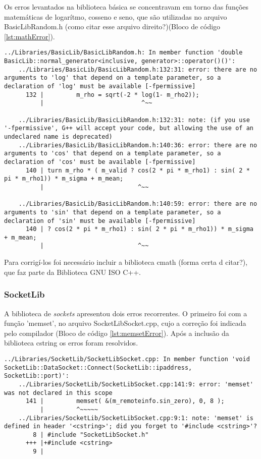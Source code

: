 Os erros levantados na biblioteca básica se concentravam em torno das funções matemáticas 
de logarítmo, cosseno e seno, que são utilizadas no arquivo BasicLibRandom.h 
(como citar esse arquivo direito?)(Bloco de código \ref{lst:mathError}).
    
\begin{lstlisting}[breaklines, label={lst:mathError}, caption={Exemplo de erros da biblioteca básica}]
    ../Libraries/BasicLib/BasicLibRandom.h: In member function 'double BasicLib::normal_generator<inclusive, generator>::operator()()':
    ../Libraries/BasicLib/BasicLibRandom.h:132:31: error: there are no arguments to 'log' that depend on a template parameter, so a declaration of 'log' must be available [-fpermissive]
      132 |         m_rho = sqrt(-2 * log(1- m_rho2));
          |                           ^~~

    ../Libraries/BasicLib/BasicLibRandom.h:132:31: note: (if you use '-fpermissive', G++ will accept your code, but allowing the use of an undeclared name is deprecated)
    ../Libraries/BasicLib/BasicLibRandom.h:140:36: error: there are no arguments to 'cos' that depend on a template parameter, so a declaration of 'cos' must be available [-fpermissive]
      140 | turn m_rho * ( m_valid ? cos(2 * pi * m_rho1) : sin( 2 * pi * m_rho1)) * m_sigma + m_mean;
          |                          ^~~

    ../Libraries/BasicLib/BasicLibRandom.h:140:59: error: there are no arguments to 'sin' that depend on a template parameter, so a declaration of 'sin' must be available [-fpermissive]
      140 | ? cos(2 * pi * m_rho1) : sin( 2 * pi * m_rho1)) * m_sigma + m_mean;
          |                          ^~~
\end{lstlisting}

Para corrigí-los foi necessário incluir a biblioteca cmath (forma certa d citar?), 
que faz parte da Biblioteca GNU ISO C++.

\subsubsection{SocketLib}

A biblioteca de \textit{sockets} apresentou dois erros recorrentes. O primeiro foi com a função 'memset',
no arquivo SocketLibSocket.cpp, cujo a correção foi indicada pelo compilador (Bloco de código \ref{lst:memsetError}). 
Após a inclusão da biblioteca cstring os erros foram resolvidos.

\begin{lstlisting}[breaklines, label={lst:memsetError}, caption={Exemplo de erro levantado pela função 'memset'}]
    ../Libraries/SocketLib/SocketLibSocket.cpp: In member function 'void SocketLib::DataSocket::Connect(SocketLib::ipaddress, SocketLib::port)':
    ../Libraries/SocketLib/SocketLibSocket.cpp:141:9: error: 'memset' was not declared in this scope
      141 |         memset( &(m_remoteinfo.sin_zero), 0, 8 );
          |         ^~~~~~
    ../Libraries/SocketLib/SocketLibSocket.cpp:9:1: note: 'memset' is defined in header '<cstring>'; did you forget to '#include <cstring>'?
        8 | #include "SocketLibSocket.h"
      +++ |+#include <cstring>
        9 | 
\end{lstlisting}


